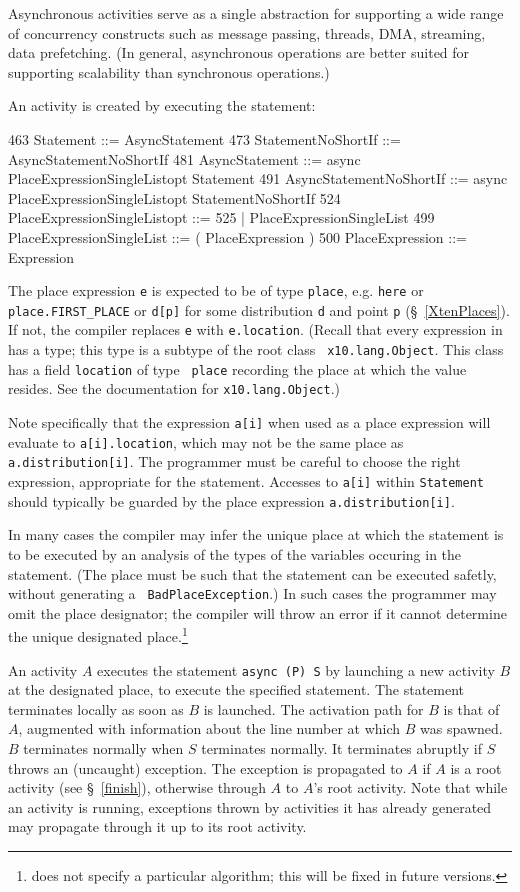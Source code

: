 Asynchronous activities serve as a single abstraction for supporting a
wide range of concurrency constructs such as message passing, threads,
DMA, streaming, data prefetching. (In general, asynchronous operations
are better suited for supporting scalability than synchronous
operations.)

An activity is created by executing the statement:
\begin{x10}
463 Statement ::= AsyncStatement
473 StatementNoShortIf ::= AsyncStatementNoShortIf
481 AsyncStatement ::= 
      async PlaceExpressionSingleListopt Statement
491 AsyncStatementNoShortIf ::= 
      async PlaceExpressionSingleListopt 
         StatementNoShortIf
524   PlaceExpressionSingleListopt ::=
525       | PlaceExpressionSingleList
499   PlaceExpressionSingleList ::= 
         ( PlaceExpression )
500   PlaceExpression ::= Expression
\end{x10} 

The place expression {\tt e} is expected to be of type {\tt place},
e.g.{} {\tt here} or {\tt place.FIRST\_PLACE} or {\tt d[p]} for some
distribution {\tt d} and point {\tt p} (\S~\ref{XtenPlaces}).  
If not, the compiler replaces
{\tt e} with {\tt e.location}. (Recall that every expression in
\Xten{} has a type; this type is a subtype of the root class {\tt
x10.lang.Object}.  This class has a field {\tt location} of type {\tt
place} recording the place at which the value resides. See
the documentation for {\tt x10.lang.Object}.)

Note specifically that the expression {\tt a[i]} when used as a place
expression will evaluate to {\tt a[i].location}, which may not be
the same place as {\tt a.distribution[i]}. The programmer must be 
careful to choose the right expression, appropriate for the statement.
Accesses to {\tt a[i]} within {\tt Statement} should typically be guarded 
by the place expression {\tt a.distribution[i]}.

In many cases the compiler may infer the unique place at which the
statement is to be executed by an analysis of the types of the
variables occuring in the statement. (The place must be such that the
statement can be executed safetly, without generating a {\tt
BadPlaceException}.) In such cases the programmer may omit the place
designator; the compiler will throw an error if it cannot 
determine the unique designated place.\footnote{\XtenCurrVer{} does 
not specify a particular algorithm; this will be fixed in future versions.}

An activity $A$ executes the statement {\tt async (P) S} by launching
a new activity $B$ at the designated place, to execute the specified
statement. The statement terminates locally as soon as $B$ is
launched.  The activation path for $B$ is that of $A$, augmented with
information about the line number at which $B$ was spawned.  $B$
terminates normally when $S$ terminates normally.  It terminates
abruptly if $S$ throws an (uncaught) exception. The exception is
propagated to $A$ if $A$ is a root activity (see \S~\ref{finish}),
otherwise through $A$ to $A$'s root activity. Note that while an
activity is running, exceptions thrown by activities it has already
generated may propagate through it up to its root activity.

